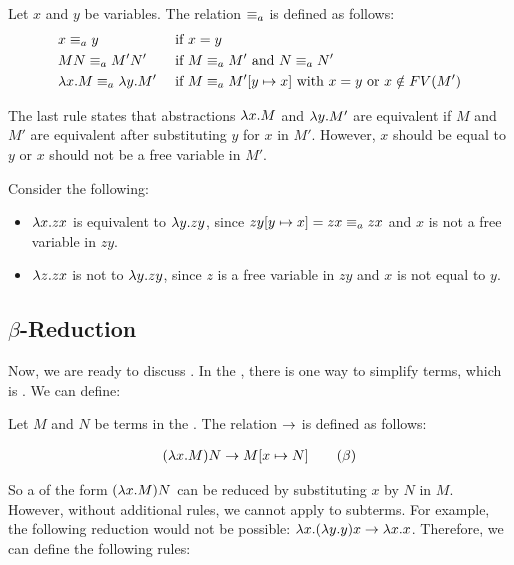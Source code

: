 \begin{definition}
	\label{def:alpha-equivalence}
	Let $x$ and $y$ be variables. The relation $\equiv_a$ is defined as follows:
	\[
	\begin{aligned}
		& x \equiv_a y                      & &  \text{ if } x = y \\
		& MN \equiv_a M'N'                  & & \text{ if } M \equiv_a M' \text{ and } N \equiv_a N' \\
		& \lambda {x}.{M} \equiv_a \lambda {y}.{M'} & & \text{ if } M \equiv_a M'[{y}\mapsto{x}] \text{ with } x = y \text{ or } x \notin FV(M') \\
	\end{aligned}
	\]
\end{definition}


\noindent The last rule states that abstractions $\lambda {x}.{M}$ and $\lambda {y}.{M'}$ are equivalent if $M$ and $M'$ are equivalent after substituting $y$ for $x$ in $M'$.
However, $x$ should be equal to $y$ or $x$ should not be a free variable in $M'$. 
\begin{example}
	Consider the following:
	\begin{itemize}
		\item 
		$\lambda {x}.{zx}$ is equivalent to $\lambda {y}.{zy}$, since $zy[{y}\mapsto{x}] = zx \equiv_a zx$ and $x$ is not a free variable in $zy$.
		\item
		$\lambda {z}.{zx}$ is not to $\lambda {y}.{zy}$, since $z$ is a free variable in $zy$ and $x$ is not equal to $y$.
	\end{itemize}
\end{example}


\subsection{\texorpdfstring{\boldmath${\beta}$-Reduction}{Beta Reduction}}
Now, we are ready to discuss \br. In the \lc, there is one way to simplify terms, which is \br. We can define:

\begin{definition}
	\label{def:beta-reduction}
	Let $M$ and $N$ be terms in the \lc. The relation $\to$ is defined as follows:
	
	\begin{align*}
		(\lambda {x}.{M})N \to M [{x}\mapsto{N}] \quad \quad (\beta)
	\end{align*}
\end{definition}


So a \lterm of the form $(\lambda {x}.{M})N$ can be reduced by substituting $x$ by $N$ in $M$. 
However, without additional rules, we cannot apply \br to subterms. 
For example, the following reduction would not be possible: $\lambda {x}.{(\lambda {y}.{y})x} \to \lambda {x}.{x}$.
Therefore, we can define the following rules:

